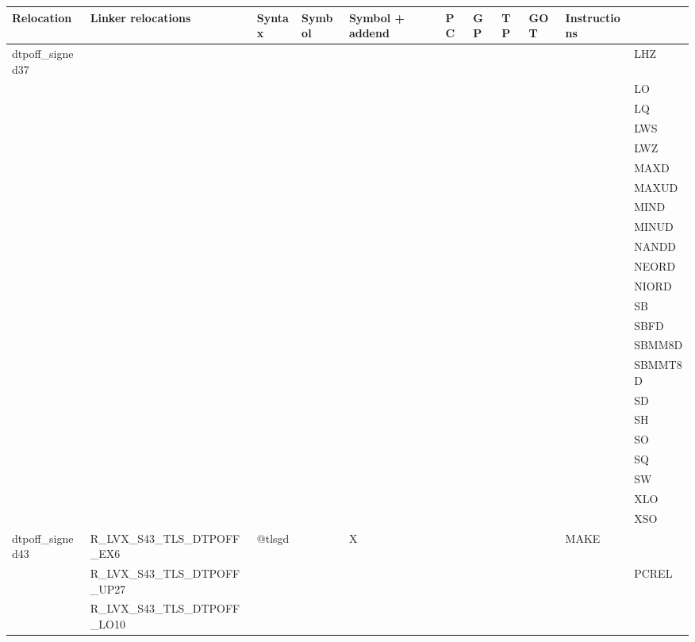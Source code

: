{\tiny
\begin{tabular}{|l|l|l|l|l|l|l|l|l|l|l|} \hline
\textsf{Relocation} & \textsf{Linker relocations} & \textsf{Syntax} & \textsf{Symbol} & \textsf{Symbol + addend} & \textsf{PC} & \textsf{GP} & \textsf{TP} & \textsf{GOT} & \textsf{Instructions} \\
\hline
\textsf{dtpoff\_signed37} & & & & & & & & & & \textsf{LHZ} \\
 & & & & & & & & & & \textsf{LO} \\
 & & & & & & & & & & \textsf{LQ} \\
 & & & & & & & & & & \textsf{LWS} \\
 & & & & & & & & & & \textsf{LWZ} \\
 & & & & & & & & & & \textsf{MAXD} \\
 & & & & & & & & & & \textsf{MAXUD} \\
 & & & & & & & & & & \textsf{MIND} \\
 & & & & & & & & & & \textsf{MINUD} \\
 & & & & & & & & & & \textsf{NANDD} \\
 & & & & & & & & & & \textsf{NEORD} \\
 & & & & & & & & & & \textsf{NIORD} \\
 & & & & & & & & & & \textsf{SB} \\
 & & & & & & & & & & \textsf{SBFD} \\
 & & & & & & & & & & \textsf{SBMM8D} \\
 & & & & & & & & & & \textsf{SBMMT8D} \\
 & & & & & & & & & & \textsf{SD} \\
 & & & & & & & & & & \textsf{SH} \\
 & & & & & & & & & & \textsf{SO} \\
 & & & & & & & & & & \textsf{SQ} \\
 & & & & & & & & & & \textsf{SW} \\
 & & & & & & & & & & \textsf{XLO} \\
 & & & & & & & & & & \textsf{XSO} \\
\hline
\textsf{dtpoff\_signed43} & \textsf{R\_LVX\_S43\_TLS\_DTPOFF\_EX6} & \textsf{@tlsgd} & \textsf{} & \textsf{X} & \textsf{} & \textsf{} & \textsf{} & \textsf{} & \textsf{MAKE} \\
 & \textsf{R\_LVX\_S43\_TLS\_DTPOFF\_UP27} & & & & & & & & & \textsf{PCREL} \\
 & \textsf{R\_LVX\_S43\_TLS\_DTPOFF\_LO10} & & & & & & & & & \\
\hline

\end{tabular}}
